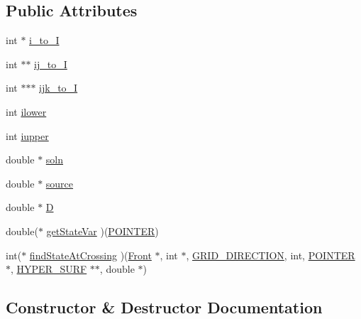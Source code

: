 \subsection*{Public Attributes}
\begin{DoxyCompactItemize}
\item 
int $\ast$ \hyperlink{class_e_l_l_i_p_t_i_c___s_o_l_v_e_r_aa877e3649485707966cc476190117197}{i\+\_\+to\+\_\+I}
\item 
int $\ast$$\ast$ \hyperlink{class_e_l_l_i_p_t_i_c___s_o_l_v_e_r_aa5b7a0c721ed832fae01a0d2a9280b1d}{ij\+\_\+to\+\_\+I}
\item 
int $\ast$$\ast$$\ast$ \hyperlink{class_e_l_l_i_p_t_i_c___s_o_l_v_e_r_a41e2a3d4ffade270642b5d21c84a941d}{ijk\+\_\+to\+\_\+I}
\item 
int \hyperlink{class_e_l_l_i_p_t_i_c___s_o_l_v_e_r_a5cac5e978dffb7dc2259d424b020fb1c}{ilower}
\item 
int \hyperlink{class_e_l_l_i_p_t_i_c___s_o_l_v_e_r_ab0d937cefba4676295541d8d2c87d1f0}{iupper}
\item 
double $\ast$ \hyperlink{class_e_l_l_i_p_t_i_c___s_o_l_v_e_r_afd88e462b1adb1a09c1a155509d3a4bc}{soln}
\item 
double $\ast$ \hyperlink{class_e_l_l_i_p_t_i_c___s_o_l_v_e_r_a4d424e8f413c716f4560811d14e40f59}{source}
\item 
double $\ast$ \hyperlink{class_e_l_l_i_p_t_i_c___s_o_l_v_e_r_a0be1aa6843b5be4612c46282f5c91856}{D}
\item 
double($\ast$ \hyperlink{class_e_l_l_i_p_t_i_c___s_o_l_v_e_r_ac1a2340039678d76934dff8e3d992b7c}{get\+State\+Var} )(\hyperlink{cdecs_8h_ae51a81000f343b8ec43bca1f6a723d7b}{P\+O\+I\+N\+T\+ER})
\item 
int($\ast$ \hyperlink{class_e_l_l_i_p_t_i_c___s_o_l_v_e_r_aa510c62cc56cfe916e2df1be54b19427}{find\+State\+At\+Crossing} )(\hyperlink{fdecs_8h_ac32202b798f848095c489cfd04c4ca5f}{Front} $\ast$, int $\ast$, \hyperlink{int_8h_aa7cc507beba6455174c0996f89fdc8c3}{G\+R\+I\+D\+\_\+\+D\+I\+R\+E\+C\+T\+I\+ON}, int, \hyperlink{cdecs_8h_ae51a81000f343b8ec43bca1f6a723d7b}{P\+O\+I\+N\+T\+ER} $\ast$, \hyperlink{int_8h_acef50fa4757ce0d3f75c97fab5a175bc}{H\+Y\+P\+E\+R\+\_\+\+S\+U\+RF} $\ast$$\ast$, double $\ast$)
\end{DoxyCompactItemize}


\subsection{Constructor \& Destructor Documentation}
